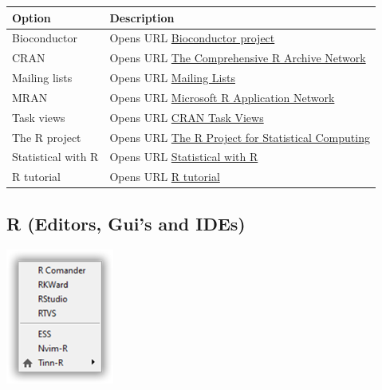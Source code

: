 \begin{scriptsize}
  \begin{tabularx}{\textwidth}{>{\hsize=0.3\hsize}X>{\hsize=0.7\hsize}X}\\
    \hline
    \textbf{Option} & \textbf{Description} \\
    \hline
    Bioconductor & Opens URL \href{http://www.bioconductor.org/}{Bioconductor project} \\
    CRAN & Opens URL \href{http://cran.r-project.org/}{The Comprehensive R Archive Network} \\
    Mailing lists & Opens URL \href{https://www.r-project.org/mail.html}{Mailing Lists} \\
    MRAN & Opens URL \href{http://mran.microsoft.com/}{Microsoft R Application Network} \\
    Task views & Opens URL \href{http://cran.r-project.org/web/views/}{CRAN Task Views} \\
    The R project & Opens URL \href{http://www.r-project.org}{The R Project for Statistical Computing} \\
    Statistical with R & Opens URL \href{http://zoonek2.free.fr/UNIX/48\_R/all.html}{Statistical with R} \\
    R tutorial & Opens URL \href{http://www.r-tutor.com/}{R tutorial} \\
    \hline
  \end{tabularx}
\end{scriptsize}


\hypertarget{menu_web_rguis}{}
\subsection{R (Editors, Gui's and IDEs)}

\includegraphics[scale=0.50]{./res/menu_web_rguis.png}\\

